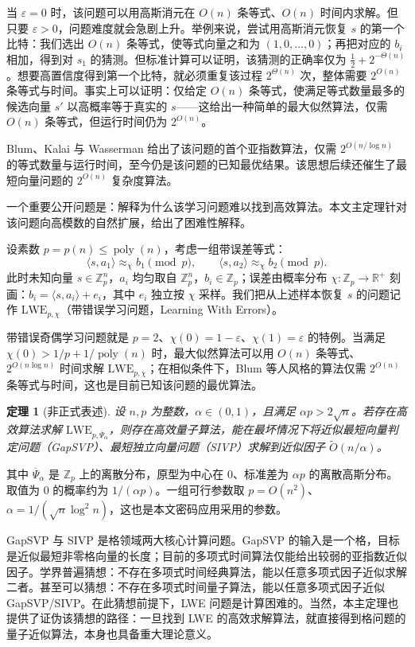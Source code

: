 \documentclass[11pt,a4paper]{article}
\newtheorem{theorem}{定理}[section]
\DeclareMathOperator{\poly}{poly}
\newcommand{\R}{\mathbb{R}}
\newcommand{\Z}{\mathbb{Z}}
\newcommand{\Psibar}{\overline{\Psi}}
\begin{document}
当 $\varepsilon=0$ 时，该问题可以用高斯消元在 $O(n)$ 条等式、$O(n)$ 时间内求解。但只要 $\varepsilon>0$，问题难度就会急剧上升。举例来说，尝试用高斯消元恢复 $s$ 的第一个比特：我们选出 $O(n)$ 条等式，使等式向量之和为 $(1,0,\dots,0)$；再把对应的 $b_{i}$ 相加，得到对 $s_{1}$ 的猜测。但标准计算可以证明，该猜测的正确率仅为 $\frac{1}{2}+2^{-\Theta(n)}$。想要高置信度得到第一个比特，就必须重复该过程 $2^{\Theta(n)}$ 次，整体需要 $2^{O(n)}$ 条等式与时间。事实上可以证明：仅给定 $O(n)$ 条等式，使满足等式数量最多的候选向量 $s'$ 以高概率等于真实的 $s$——这给出一种简单的最大似然算法，仅需 $O(n)$ 条等式，但运行时间仍为 $2^{O(n)}$。

Blum、Kalai 与 Wasserman 给出了该问题的首个亚指数算法，仅需 $2^{O(n/\log n)}$ 的等式数量与运行时间，至今仍是该问题的已知最优结果。该思想后续还催生了最短向量问题的 $2^{O(n)}$ 复杂度算法。

一个重要公开问题是：解释为什么该学习问题难以找到高效算法。本文主定理针对该问题向高模数的自然扩展，给出了困难性解释。

设素数 $p=p(n)\le \poly(n)$，考虑一组带误差等式：
\[
  \langle s,a_{1}\rangle \approx_{\chi} b_{1} \pmod{p},
  \qquad
  \langle s,a_{2}\rangle \approx_{\chi} b_{2} \pmod{p}.
\]
此时未知向量 $s\in\Z_{p}^{n}$，$a_{i}$ 均匀取自 $\Z_{p}^{n}$，$b_{i}\in\Z_{p}$；误差由概率分布 $\chi:\Z_{p}\to\R^{+}$ 刻画：$b_{i}=\langle s,a_{i}\rangle+e_{i}$，其中 $e_{i}$ 独立按 $\chi$ 采样。我们把从上述样本恢复 $s$ 的问题记作 $\mathrm{LWE}_{p,\chi}$（带错误学习问题，Learning With Errors）。

带错误奇偶学习问题就是 $p=2$、$\chi(0)=1-\varepsilon$、$\chi(1)=\varepsilon$ 的特例。当满足 $\chi(0)>1/p+1/\poly(n)$ 时，最大似然算法可以用 $O(n)$ 条等式、$2^{O(n\log n)}$ 时间求解 $\mathrm{LWE}_{p,\chi}$；在相似条件下，Blum 等人风格的算法仅需 $2^{O(n)}$ 条等式与时间，这也是目前已知该问题的最优算法。

\begin{theorem}[非正式表述]
设 $n,p$ 为整数，$\alpha\in(0,1)$，且满足 $\alpha p>2\sqrt{n}$。若存在高效算法求解 $\mathrm{LWE}_{p,\Psibar_{\alpha}}$，则存在高效量子算法，能在最坏情况下将近似最短向量判定问题（GapSVP）、最短独立向量问题（SIVP）求解到近似因子 $\widetilde{O}(n/\alpha)$。
\end{theorem}

其中 $\Psibar_{\alpha}$ 是 $\Z_{p}$ 上的离散分布，原型为中心在 $0$、标准差为 $\alpha p$ 的离散高斯分布。取值为 $0$ 的概率约为 $1/(\alpha p)$。一组可行参数取 $p=O(n^{2})$、$\alpha=1/(\sqrt{n}\log^{2}n)$，这也是本文密码应用采用的参数。

GapSVP 与 SIVP 是格领域两大核心计算问题。GapSVP 的输入是一个格，目标是近似最短非零格向量的长度；目前的多项式时间算法仅能给出较弱的亚指数近似因子。学界普遍猜想：不存在多项式时间经典算法，能以任意多项式因子近似求解二者。甚至可以猜想：不存在多项式时间量子算法，能以任意多项式因子近似 GapSVP/SIVP。在此猜想前提下，LWE 问题是计算困难的。当然，本主定理也提供了证伪该猜想的路径：一旦找到 LWE 的高效求解算法，就直接得到格问题的量子近似算法，本身也具备重大理论意义。
\end{document}
